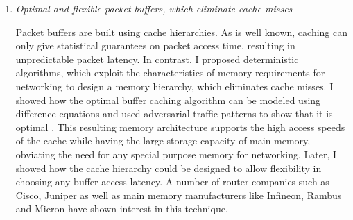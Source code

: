\documentclass[a4paper, 12pt]{article}
\begin{document}
\begin{small}


\begin{enumerate}


\item {\em Optimal and flexible packet buffers, which eliminate cache misses}


Packet buffers are built using cache hierarchies. As is well known, caching
can only give statistical guarantees on packet access time, resulting in unpredictable packet
latency.
In contrast, I proposed deterministic algorithms, which exploit the characteristics
of memory requirements for networking to design a memory hierarchy, which eliminates cache misses.
I showed how the optimal buffer caching algorithm can be modeled using difference equations and
used adversarial traffic patterns to show that it is optimal \cite{buffer}.
This resulting memory architecture supports the high access speeds of the cache while
having the large storage capacity of main memory, obviating the need for any special purpose memory
for networking.
Later, I showed how the cache hierarchy could be designed to allow
flexibility in choosing any buffer access latency.
A number of router companies such as Cisco, Juniper as well as main memory manufacturers
like Infineon, Rambus and Micron have shown interest in this technique.



\end{enumerate}
\end{small}
\end{document}
